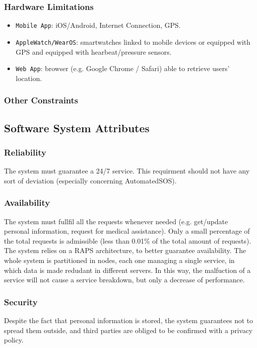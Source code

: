 \documentclass[12pt,a4paper]{article}
\begin{document}
	\subsubsection{Hardware Limitations}
		\begin{itemize}
			\item \texttt{Mobile App}: iOS/Android, Internet Connection, GPS.
			\item \texttt{AppleWatch/WearOS}: smartwatches linked to mobile devices or equipped with GPS and equipped with hearbeat/pressure sensors.
			\item \texttt{Web App}: browser (e.g. Google Chrome / Safari) able to retrieve users' location.
		\end{itemize}
	\subsubsection{Other Constraints}
	
	\subsection{Software System Attributes}
	\subsubsection{Reliability}
	The system must guarantee a 24/7 service. This requirment should not have any sort of deviation (especially concerning AutomatedSOS).
	\subsubsection{Availability}
	The system must fullfil all the requests whenever needed (e.g. get/update personal information, request for medical assistance). Only a small percentage of the total requests is admissible (less than 0.01\% of the total amount of requests). The system relies on a RAPS architecture, to better guarantee availability. The whole system is partitioned in nodes, each one managing a single service, in which data is made redudant in different servers. In this way, the malfuction of a service will not cause a service breakdown, but only a decrease of performance.
	\subsubsection{Security}
	Despite the fact that personal information is stored, the system guarantees not to spread them outside, and third parties are obliged to be confirmed with a privacy policy.
\end{document}
